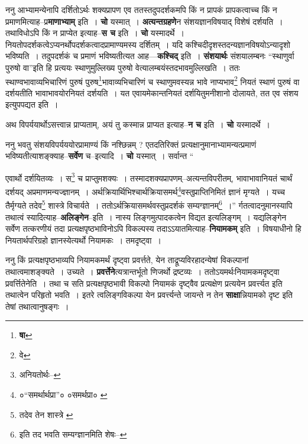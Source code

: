 \documentclass[article,12pt,a4paper]{memoir}
\begin{document}
	  \pstart ननु आभ्यामन्येनापि दर्शितोऽर्थः शक्यप्रापण एव ततस्तदुपदर्शकमपि किं न प्रापकं प्रापकत्वाच्च किं न प्रमाणमित्याह--प्र\textbf{माणाभ्याम्} इति । \textbf{चो} यस्मात् । \textbf{अत्यन्तग्रहणे}न संशयज्ञानविषयाद् विशेषं दर्शयति । तथाविधोऽपि किं न प्राप्येत इत्याह--\textbf{स च} इति । \textbf{चो} यस्मादर्थे । नियतोपदर्शकत्वेऽप्यनर्थोपदर्शकत्वादप्रामाण्यमस्य दर्शितम् । यदि कश्चिदीदृशस्तदन्यज्ञानविषयोऽन्यादृशो भविष्यति । तदुपदर्शकं च प्रमाणं भविष्यतीत्यत आह—\textbf{कश्चिद्} इति । \textbf{संशयार्थः} संशयालम्बनः “स्थाणुर्वा पुरुषो वा”इति हि प्रत्ययः स्थाणुमुल्लिख्य पुरुषो वेत्यालम्बयंस्तदभावमुल्लिखति । ततः स्थाण्वभावाव्यभिचारिणं पुरुषं पुरुष\footnote{\textbf{षा}}भावाव्यभिचारिणं च स्थाणुमवस्यन्न भावे नाप्यभाव\footnote{वे} नियतं स्थाणं पुरुषं वा दर्शयतीति भावाभावयोरनियतं दर्शयति । यत एवायमेकान्तनियतं दर्शयितुमनीशानो दोलायते, तत एव संशय इत्युपपद्यत इति ।
	\pend
      

	  \pstart अथ विपर्ययार्थोऽसत्त्वान्न प्राप्यताम्, अयं तु कस्मान्न प्राप्यत इत्याह--\textbf{न च} इति । \textbf{चो} यस्मादर्थे ।
	\pend
      

	  \pstart ननु भवतु संशयविपर्यययोरप्रामाण्यं\leavevmode{} किं नश्छिन्नम् ? एतदतिरिक्तं प्रत्यक्षानुमानाभ्यामन्यत्प्रमाणं भविष्यतीत्याशङ्क्याह--\textbf{सर्वेण} च--इत्यादि । \textbf{चो} यस्मात् । सर्वान्त  \leavevmode{} “
	  
	एवार्थो दर्शयितव्यः । स\footnote{अनियतोर्थः--\cite{dp-msD-n}} च प्राप्तुमशक्यः । तस्मादशक्यप्रापणम्--अत्यन्तविपरीतम्, भावाभावानियतं चार्थं दर्शयद् अप्रमाणमन्यज्ज्ञानम् । अर्थक्रियार्थिभिश्चार्थक्रियासमर्थ\footnote{०“समर्थार्थप्रा”० \cite{dp-msA} \cite{dp-edH} \cite{dp-edP} \cite{dp-edN} ०समर्थप्रा० \cite{dp-msB} \cite{dp-edE}}वस्तुप्राप्तिनिमितं ज्ञानं मृग्यते । यच्च तैर्मृग्यते तदेव\footnote{तदेव तेन शास्त्रे \cite{dp-msB} \cite{dp-edH}} शास्त्रे विचार्यते । ततोऽर्थक्रियासमर्थवस्तुप्रदर्शकं सम्यग्ज्ञानम्\footnote{इति तद भवति सम्यग्ज्ञानमिति शेषः--\cite{dp-msD-n}} ।” र्गतत्वादनुमानस्यापि तथात्वं स्यादित्याह--\textbf{अलिङ्गेन}--इति । नास्य लिङ्गमुत्पादकत्वेन विद्यत इत्यलिङ्गम् । यद्यलिङ्गेन सर्वेण तत्करणीयं तदा प्रत्यक्षपृष्ठभाविनोऽपि विकल्पस्य तदाऽऽयातमित्याह--\textbf{नियामकम्} इति । विषयाधीनो हि नियतार्थपरिग्रहो ज्ञानस्येत्यर्थो नियामकः । तमदृष्ट्वा ।
	\pend
      

	  \pstart ननु किं प्रत्यक्षपृष्ठभाव्यपि नियामकमर्थं दृष्ट्वा प्रवर्त्तते, येन ताद्रूप्यविरहादन्येषां विकल्पानां तथात्वमाशङ्क्यते । उच्यते । \textbf{प्रवर्त्तेने}त्यत्रान्तर्भूतो णिजर्थो द्रष्टव्यः । ततोऽयमर्थःनियामकमदृष्ट्वा प्रवर्त्तितेनेति । तथा च सति प्रत्यक्षपृष्ठभावी विकल्पो नियामकं दृष्ट्वैव प्रत्यक्षेण प्रत्ययेन प्रवर्त्त्यत इति तथात्वेन परिहृतो भवति । इतरे त्वलिङ्गविकल्पा येन प्रवर्त्त्यन्ते जायन्ते न तेन \textbf{साक्षा}न्नियामको दृष्ट इति तेषां तथात्वानुषङ्गः ।
	\pend
      
\end{document}
